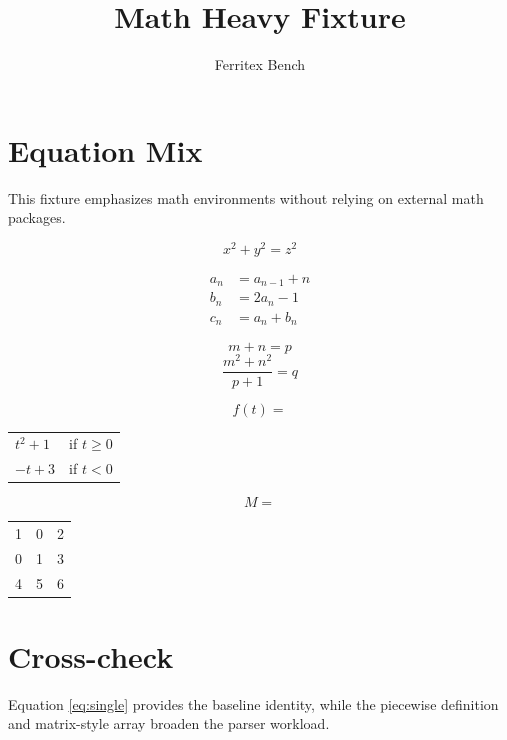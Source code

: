 \documentclass{article}
\title{Math Heavy Fixture}
\author{Ferritex Bench}
\newcommand{\alignedsystem}{
    \begin{align}
    a_n &= a_{n-1} + n \\
    b_n &= 2a_n - 1 \\
    c_n &= a_n + b_n
    \end{align}
  }
\newcommand{\alignedsystem}{
    \begin{eqnarray}
    a_n &=& a_{n-1} + n \\
    b_n &=& 2a_n - 1 \\
    c_n &=& a_n + b_n
    \end{eqnarray}
  }
\newcommand{\casesblock}{
    \[
    f(t) =
    \]
    \begin{tabular}{ll}
    $t^2 + 1$ & if $t \geq 0$ \\
    $-t + 3$ & if $t < 0$
    \end{tabular}
  }
\newcommand{\matrixblock}{
    \[
    M =
    \]
    \begin{tabular}{ccc}
    1 & 0 & 2 \\
    0 & 1 & 3 \\
    4 & 5 & 6
    \end{tabular}
  }
\newcommand{\casesblock}{
    \[
    f(t) =
    \begin{array}{ll}
    t^2 + 1 & \mathrm{if}\ t \geq 0 \\
    -t + 3 & \mathrm{if}\ t < 0
    \end{array}
    \]
  }
\newcommand{\matrixblock}{
    \[
    M =
    \begin{array}{ccc}
    1 & 0 & 2 \\
    0 & 1 & 3 \\
    4 & 5 & 6
    \end{array}
    \]
  }
\begin{document}
\maketitle

\section{Equation Mix}
This fixture emphasizes math environments without relying on external math packages.

\begin{equation}\label{eq:single}
x^2 + y^2 = z^2
\end{equation}

\alignedsystem

\[
m + n = p
\]
\[
\frac{m^2 + n^2}{p + 1} = q
\]

\casesblock

\matrixblock

\section{Cross-check}
Equation \ref{eq:single} provides the baseline identity, while the piecewise definition and matrix-style array broaden the parser workload.
\end{document}
